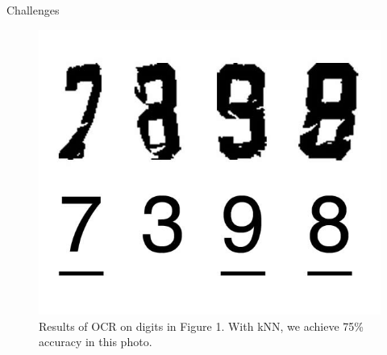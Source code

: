 \documentclass[final]{beamer}
\newlength{\onecolwid}
\newlength{\twocolwid}
\begin{document}
\begin{frame}[t]
\begin{columns}[t]
\begin{column}{\twocolwid}
\begin{columns}[t,totalwidth=\twocolwid]
\begin{column}{\onecolwid}
\begin{block}{Challenges}
\end{block}

\begin{figure}
\includegraphics[width=0.8\linewidth]{recognized.jpg}
\caption{Results of OCR on digits in Figure 1. With kNN, we achieve 75\% accuracy in this photo.}
\end{figure}


\end{column} %

\end{columns} %






\begin{columns}[t,totalwidth=\twocolwid] %


\end{columns}
\end{column}
\end{columns}
\end{frame}
\end{document}
